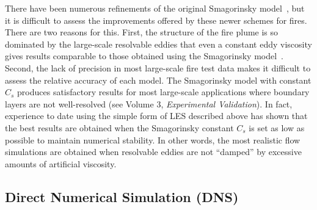 \documentclass[11pt]{book}
\begin{document}
There have been numerous refinements of the original Smagorinsky
model~\cite{Deardorff:1,Germano:1,Lilly:1},
but it is difficult to assess the improvements offered by these newer
schemes for fires. There are two reasons for this. First, the structure of the
fire plume is so dominated by the large-scale resolvable eddies that
even a constant eddy viscosity gives results comparable to
those obtained using the Smagorinsky model~\cite{Baum:4}. Second, the lack
of precision in most large-scale fire test data makes it difficult to
assess the relative accuracy of each model.
The Smagorinsky model with constant $C_s$ produces satisfactory results
for most large-scale applications where boundary layers are not
well-resolved (see Volume 3, {\em Experimental Validation}). In fact, experience to date using the simple form of LES described above
has shown that the best results are obtained when the Smagorinsky constant $C_s$ is set
as low as possible to maintain numerical stability. In other words, the most realistic
flow simulations are obtained when resolvable eddies are not ``damped'' by excessive
amounts of artificial viscosity.



\subsection{Direct Numerical Simulation (DNS)}
\label{DNS}
\end{document}
